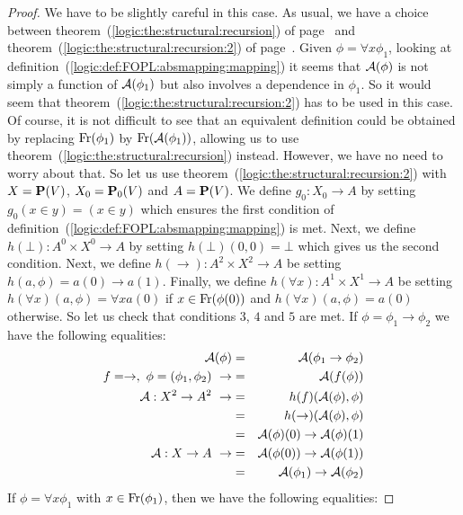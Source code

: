 \begin{proof}
We have to be slightly careful in this case. As usual, we have a
choice between theorem~(\ref{logic:the:structural:recursion}) of
page~\pageref{logic:the:structural:recursion} and
theorem~(\ref{logic:the:structural:recursion:2}) of
page~\pageref{logic:the:structural:recursion:2}. Given $\phi=\forall
x\phi_{1}$, looking at
definition~(\ref{logic:def:FOPL:absmapping:mapping}) it seems that
${\cal A}(\phi)$ is not simply a function of ${\cal A}(\phi_{1})$
but also involves a dependence in $\phi_{1}$. So it would seem that
theorem~(\ref{logic:the:structural:recursion:2}) has to be used in
this case. Of course, it is not difficult to see that an equivalent
definition could be obtained by replacing $\mbox{\rm Fr}(\phi_{1})$ by
$\mbox{\rm Fr}({\cal A}(\phi_{1}))$, allowing us to use
theorem~(\ref{logic:the:structural:recursion}) instead. However, we
have no need to worry about that. So let us use
theorem~(\ref{logic:the:structural:recursion:2}) with $X=\mbox{${\bf P}(V)$}$,
$X_{0}=\mbox{${\bf P}_{0}(V)$}$ and $A=\mbox{${\bf P}(V)$}$. We define $g_{0}:X_{0}\to A$ by setting
$g_{0}(x\in y)=(x\in y)$ which ensures the first condition of
definition~(\ref{logic:def:FOPL:absmapping:mapping}) is met. Next,
we define $h(\bot):A^{0}\times X^{0}\to A$ by setting
$h(\bot)(0,0)=\bot$ which gives us the second condition. Next, we
define $h(\to):A^{2}\times X^{2}\to A$ be setting $h(a,\phi)=a(0)\to
a(1)$. Finally, we define $h(\forall x):A^{1}\times X^{1}\to A$ be
setting $h(\forall x)(a,\phi)=\forall x a(0)$ if
$x\in\mbox{\rm Fr}(\phi(0))$ and $h(\forall x)(a,\phi)=a(0)$ otherwise. So
let us check that conditions $3$, $4$ and $5$ are met. If
$\phi=\phi_{1}\to\phi_{2}$ we have the following equalities:
    \begin{eqnarray*}
    {\cal A}(\phi)&=&{\cal A}(\phi_{1}\to\phi_{2})\\
    f=\to,\ \phi=(\phi_{1},\phi_{2})\ \rightarrow
    &=&{\cal A}(f(\phi))\\
    {\cal A}:X^{2}\to A^{2}\ \rightarrow
    &=&h(f)({\cal A}(\phi),\phi)\\
    &=&h(\to)({\cal A}(\phi),\phi)\\
    &=&{\cal A}(\phi)(0)\to{\cal A}(\phi)(1)\\
    {\cal A}:X\to A\ \rightarrow
    &=&{\cal A}(\phi(0))\to{\cal A}(\phi(1))\\
    &=&{\cal A}(\phi_{1})\to{\cal A}(\phi_{2})\\
    \end{eqnarray*}
If $\phi=\forall x\phi_{1}$ with $x\in\mbox{\rm Fr}(\phi_{1})$, then we have
the following equalities:

\end{proof}
